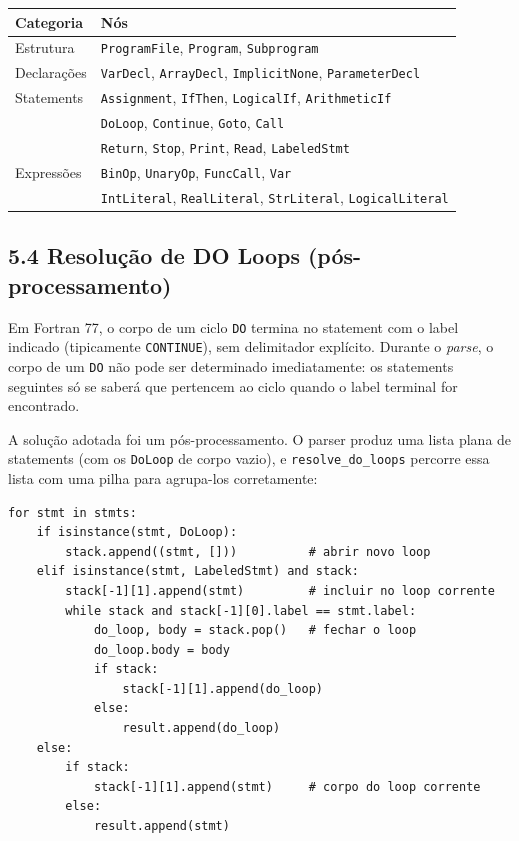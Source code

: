 \documentclass[a4paper]{article}
\begin{document}
\begin{center}
\begin{tabular}{ll}
\toprule
\textbf{Categoria} & \textbf{Nós} \\
\midrule
Estrutura       & \texttt{ProgramFile}, \texttt{Program}, \texttt{Subprogram} \\
Declarações     & \texttt{VarDecl}, \texttt{ArrayDecl}, \texttt{ImplicitNone}, \texttt{ParameterDecl} \\
Statements      & \texttt{Assignment}, \texttt{IfThen}, \texttt{LogicalIf}, \texttt{ArithmeticIf} \\
                & \texttt{DoLoop}, \texttt{Continue}, \texttt{Goto}, \texttt{Call} \\
                & \texttt{Return}, \texttt{Stop}, \texttt{Print}, \texttt{Read}, \texttt{LabeledStmt} \\
Expressões      & \texttt{BinOp}, \texttt{UnaryOp}, \texttt{FuncCall}, \texttt{Var} \\
                & \texttt{IntLiteral}, \texttt{RealLiteral}, \texttt{StrLiteral}, \texttt{LogicalLiteral} \\
\bottomrule
\end{tabular}
\end{center}

\subsection*{5.4 Resolução de DO Loops (pós-processamento)}

\noindent Em Fortran 77, o corpo de um ciclo \texttt{DO} termina no statement com o label indicado (tipicamente \texttt{CONTINUE}), sem delimitador explícito. Durante o \textit{parse}, o corpo de um \texttt{DO} não pode ser determinado imediatamente: os statements seguintes só se saberá que pertencem ao ciclo quando o label terminal for encontrado.

\vspace{0.2cm}

\noindent A solução adotada foi um pós-processamento. O parser produz uma lista plana de statements (com os \texttt{DoLoop} de corpo vazio), e \texttt{resolve\_do\_loops} percorre essa lista com uma pilha para agrupa-los corretamente:

\vspace{0.2cm}

\begin{lstlisting}[style=py]
for stmt in stmts:
    if isinstance(stmt, DoLoop):
        stack.append((stmt, []))          # abrir novo loop
    elif isinstance(stmt, LabeledStmt) and stack:
        stack[-1][1].append(stmt)         # incluir no loop corrente
        while stack and stack[-1][0].label == stmt.label:
            do_loop, body = stack.pop()   # fechar o loop
            do_loop.body = body
            if stack:
                stack[-1][1].append(do_loop)
            else:
                result.append(do_loop)
    else:
        if stack:
            stack[-1][1].append(stmt)     # corpo do loop corrente
        else:
            result.append(stmt)
\end{lstlisting}
\end{document}
